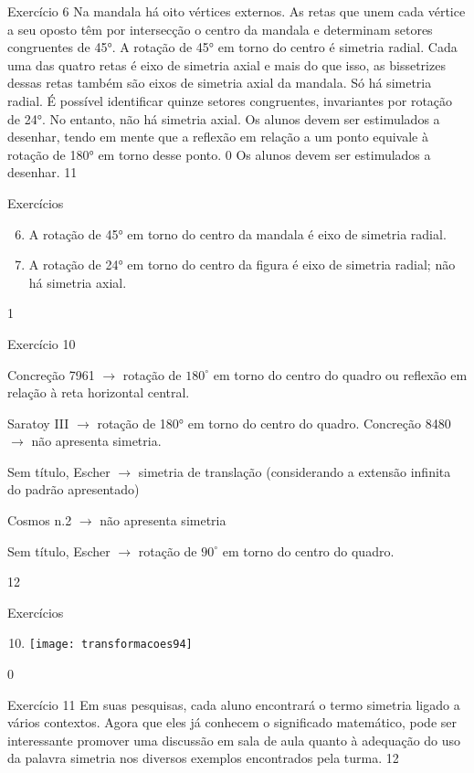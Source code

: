 \marginpar{\vspace{-1em}}
\begin{sugestions}{Exercício 6}
{
Na mandala há oito vértices externos. As retas que unem cada vértice a seu oposto têm por intersecção o centro da mandala e determinam setores congruentes de 45°. A rotação de 45° em torno do centro é simetria radial. Cada uma das quatro retas é eixo de simetria axial e mais do que isso, as bissetrizes dessas retas também são eixos de simetria axial da mandala.
Só há simetria radial. É possível identificar quinze setores congruentes, invariantes por rotação de 24°. No entanto, não há simetria axial.
Os alunos devem ser estimulados a desenhar, tendo em mente que a reflexão em relação a um ponto equivale à rotação de 180° em torno desse ponto. 
0
Os alunos devem ser estimulados a desenhar. 
}{1}{1}
\end{sugestions}
\begin{answer}{Exercícios}
{\exerciselist
\begin{enumerate}\setcounter{enumi}{5}
\item A rotação de 45° em torno do centro da mandala é eixo de simetria radial. 
\item A rotação de 24° em torno do centro da figura é eixo de simetria radial; não há simetria axial.
\end{enumerate}
}{1}
\end{answer}
\clearmargin
\begin{sugestions}{Exercício 10}
{
Concreção 7961 $\rightarrow$ rotação de $180^{\circ}$ em torno do centro do quadro ou reflexão em relação à reta horizontal central. 

Saratoy III $\rightarrow$ rotação de 180° em torno do centro do quadro.
Concreção 8480 $\rightarrow$ não apresenta simetria.

Sem título, Escher $\rightarrow$ simetria de translação (considerando a extensão infinita do padrão apresentado)

Cosmos n.2 $\rightarrow$ não apresenta simetria

Sem título, Escher $\rightarrow$ rotação de $90^{\circ}$ em torno do centro do quadro.
}{1}{2}
\end{sugestions}
\begin{answer}{Exercícios}
{\exerciselist
\begin{enumerate}\setcounter{enumi}{9}
\item 
{}
{
\texttt{[image: transformacoes94]}
}
\end{enumerate}
}{0}
\end{answer}
\clearmargin
\clearmargin
\begin{sugestions}{Exercício 11}
{
Em suas pesquisas, cada aluno encontrará o termo simetria ligado a vários contextos. Agora que eles já conhecem o significado matemático, pode ser interessante promover uma discussão em sala de aula quanto à adequação do uso da palavra simetria nos diversos exemplos encontrados pela turma.
}{1}{2}
\end{sugestions}

